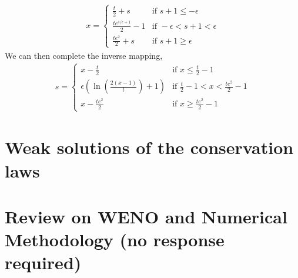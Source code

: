 \documentclass{article}
\begin{document}
\begin{gather*}
    x = \begin{cases}
        \frac{t}{2} + s & \text{if } s + 1 \le -\epsilon\\
        \frac{te^{s/\epsilon + 1}}{2} - 1 & \text{if } -\epsilon <  s + 1 < \epsilon\\
        \frac{te^2}{2} + s & \text{if } s + 1 \ge \epsilon
        \end{cases}
\end{gather*}
We can then complete the inverse mapping, 
\begin{gather*}
    s = \begin{cases}
        x - \frac{t}{2} & \text{if } x \le \frac{t}{2} - 1 \\
        \epsilon \left(\ln\left(\frac{2(x-1)}{t}\right) + 1\right) & \text{if } \frac{t}{2} - 1 < x < \frac{te^2}{2} -1\\
        x - \frac{te^2}{2} & \text{if } x \ge  \frac{te^2}{2} -1 
    \end{cases}
\end{gather*}



\section{Weak solutions of the conservation laws}

\section{Review on WENO and Numerical Methodology (no response required)}
\end{document}

